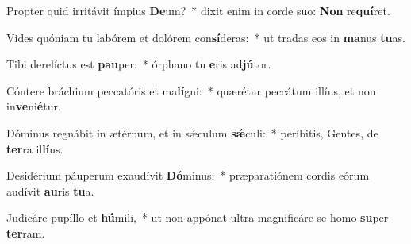 \item Propter quid irritávit ímpius \textbf{De}um?~* dixit enim in corde suo: \textbf{Non} re\textbf{quí}ret.
\item Vides quóniam tu labórem et dolórem con\textbf{sí}deras:~* ut tradas eos in \textbf{ma}nus \textbf{tu}as.
\item Tibi derelíctus est \textbf{pau}per:~* órphano tu \textbf{e}ris ad\textbf{jú}tor.
\item Cóntere bráchium peccatóris et ma\textbf{lí}gni:~* quærétur peccátum illíus, et non in\textbf{ve}ni\textbf{é}tur.
\item Dóminus regnábit in ætérnum, et in sǽculum \textbf{sǽ}culi:~* períbitis, Gentes, de \textbf{ter}ra il\textbf{lí}us.
\item Desidérium páuperum exaudívit \textbf{Dó}minus:~* præparatiónem cordis eórum audívit \textbf{au}ris \textbf{tu}a.
\item Judicáre pupíllo et \textbf{hú}mili,~* ut non appónat ultra magnificáre se homo \textbf{su}per \textbf{ter}ram.
